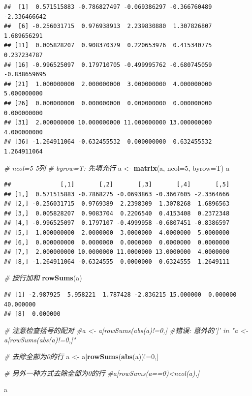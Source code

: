 \documentclass[]{article}
\newenvironment{Shaded}{\begin{snugshade}}{\end{snugshade}}
\newcommand{\KeywordTok}[1]{\textcolor[rgb]{0.13,0.29,0.53}{\textbf{{#1}}}}
\newcommand{\DataTypeTok}[1]{\textcolor[rgb]{0.13,0.29,0.53}{{#1}}}
\newcommand{\DecValTok}[1]{\textcolor[rgb]{0.00,0.00,0.81}{{#1}}}
\newcommand{\StringTok}[1]{\textcolor[rgb]{0.31,0.60,0.02}{{#1}}}
\newcommand{\CommentTok}[1]{\textcolor[rgb]{0.56,0.35,0.01}{\textit{{#1}}}}
\newcommand{\NormalTok}[1]{{#1}}
\numberwithin{figure}{section}
\numberwithin{table}{section}
\theoremstyle{definition}
\theoremstyle{definition}
\theoremstyle{definition}
\theoremstyle{remark}
\begin{document}
\begin{verbatim}
##  [1]  0.571515883 -0.786827497 -0.069386297 -0.366760489 -2.336466642
##  [6] -0.256031715  0.976938913  2.239830880  1.307826807  1.689656291
## [11]  0.005828207  0.908370379  0.220653976  0.415340775  0.237234787
## [16] -0.996525097  0.179710705 -0.499995762 -0.680745059 -0.838659695
## [21]  1.000000000  2.000000000  3.000000000  4.000000000  5.000000000
## [26]  0.000000000  0.000000000  0.000000000  0.000000000  0.000000000
## [31]  2.000000000 10.000000000 11.000000000 13.000000000  4.000000000
## [36] -1.264911064 -0.632455532  0.000000000  0.632455532  1.264911064
\end{verbatim}

\begin{Shaded}
\begin{Highlighting}[]
\CommentTok{# ncol=5 5列}
\CommentTok{# byrow=T: 先填充行}
\NormalTok{a <-}\StringTok{ }\KeywordTok{matrix}\NormalTok{(a, }\DataTypeTok{ncol=}\DecValTok{5}\NormalTok{, }\DataTypeTok{byrow=}\NormalTok{T)}
\NormalTok{a}
\end{Highlighting}
\end{Shaded}

\begin{verbatim}
##              [,1]       [,2]       [,3]       [,4]       [,5]
## [1,]  0.571515883 -0.7868275 -0.0693863 -0.3667605 -2.3364666
## [2,] -0.256031715  0.9769389  2.2398309  1.3078268  1.6896563
## [3,]  0.005828207  0.9083704  0.2206540  0.4153408  0.2372348
## [4,] -0.996525097  0.1797107 -0.4999958 -0.6807451 -0.8386597
## [5,]  1.000000000  2.0000000  3.0000000  4.0000000  5.0000000
## [6,]  0.000000000  0.0000000  0.0000000  0.0000000  0.0000000
## [7,]  2.000000000 10.0000000 11.0000000 13.0000000  4.0000000
## [8,] -1.264911064 -0.6324555  0.0000000  0.6324555  1.2649111
\end{verbatim}

\begin{Shaded}
\begin{Highlighting}[]
\CommentTok{# 按行加和}
\KeywordTok{rowSums}\NormalTok{(a)}
\end{Highlighting}
\end{Shaded}

\begin{verbatim}
## [1] -2.987925  5.958221  1.787428 -2.836215 15.000000  0.000000 40.000000
## [8]  0.000000
\end{verbatim}

\begin{Shaded}
\begin{Highlighting}[]
\CommentTok{# 注意检查括号的配对}
\CommentTok{#a <- a[rowSums(abs(a)!=0,]}
\CommentTok{#错误: 意外的']' in "a <- a[rowSums(abs(a)!=0,]"}

\CommentTok{# 去除全部为0的行}
\NormalTok{a <-}\StringTok{ }\NormalTok{a[}\KeywordTok{rowSums}\NormalTok{(}\KeywordTok{abs}\NormalTok{(a))!=}\DecValTok{0}\NormalTok{,]}

\CommentTok{# 另外一种方式去除全部为0的行}
\CommentTok{#a[rowSums(a==0)<ncol(a),]}

\NormalTok{a}
\end{Highlighting}
\end{Shaded}
\end{document}
